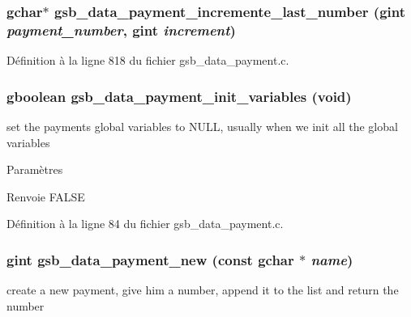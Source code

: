 \subsubsection[{gsb\_\-data\_\-payment\_\-incremente\_\-last\_\-number}]{\setlength{\rightskip}{0pt plus 5cm}gchar$\ast$ gsb\_\-data\_\-payment\_\-incremente\_\-last\_\-number (gint {\em payment\_\-number}, \/  gint {\em increment})}\label{gsb__data__payment_8h_a15adc3fcd792571b25cfef5fd1779bd6}


Définition à la ligne 818 du fichier gsb\_\-data\_\-payment.c.

\subsubsection[{gsb\_\-data\_\-payment\_\-init\_\-variables}]{\setlength{\rightskip}{0pt plus 5cm}gboolean gsb\_\-data\_\-payment\_\-init\_\-variables (void)}\label{gsb__data__payment_8h_ab3a02cace81e02ece354b3b1579156f2}
set the payments global variables to NULL, usually when we init all the global variables


\begin{DoxyParams}{Paramètres}
\item[{\em }]\end{DoxyParams}
\begin{DoxyReturn}{Renvoie}
FALSE 
\end{DoxyReturn}


Définition à la ligne 84 du fichier gsb\_\-data\_\-payment.c.

\subsubsection[{gsb\_\-data\_\-payment\_\-new}]{\setlength{\rightskip}{0pt plus 5cm}gint gsb\_\-data\_\-payment\_\-new (const gchar $\ast$ {\em name})}\label{gsb__data__payment_8h_a839e324a76bf9095b680b6e94d76f4b7}
create a new payment, give him a number, append it to the list and return the number


